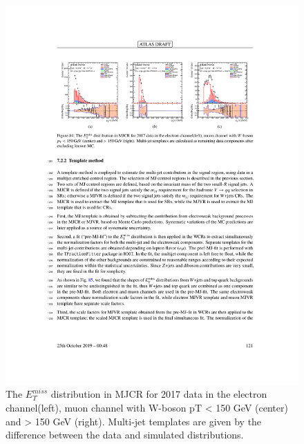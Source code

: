 \begin{figure}[htpb]
  \centering
  \includegraphics{figures/Analysis/multijet/multijet_met.pdf}
      \caption{The $E_{T}^{miss}$ distribution in MJCR for 2017 data in the electron channel(left), muon channel with W-boson pT < 150 GeV (center) and > 150 GeV (right). Multi-jet templates are given by the difference between the data and simulated distributions.} 
  \label{fig:multijet_met}
\end{figure} 
\FloatBarrier



